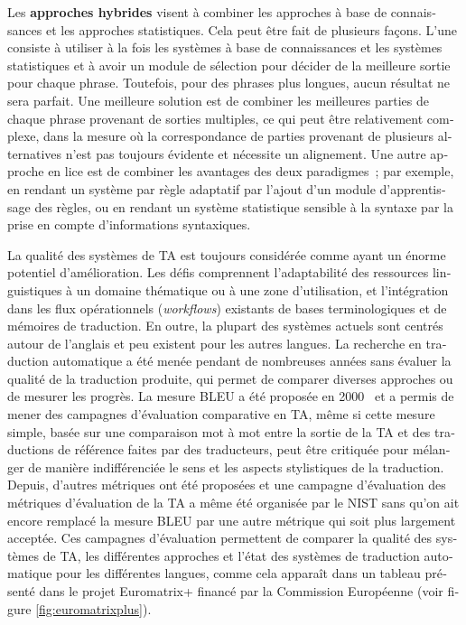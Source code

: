 \begin{french}
\begin{multicols}{2}
Les {\bf approches hybrides} visent à combiner les approches à base de
connaissances et les approches statistiques. Cela peut être fait de
plusieurs façons. L'une consiste à utiliser à la fois les
systèmes à base de connaissances et les systèmes statistiques et à
avoir un module de sélection pour décider de la meilleure sortie pour
chaque phrase. Toutefois, pour des phrases plus longues, aucun
résultat ne sera parfait. Une meilleure solution est de combiner les
meilleures parties de chaque phrase provenant de sorties multiples, ce
qui peut être relativement complexe, dans la mesure où la
correspondance de parties provenant de plusieurs alternatives n'est pas toujours évidente et nécessite un alignement. Une autre
approche en lice est de combiner les avantages des deux paradigmes~;
par exemple, en rendant un système par règle adaptatif par l'ajout d'un module d'apprentissage des règles, ou
en rendant un système statistique sensible à la syntaxe par la prise
en compte d'informations syntaxiques.

La qualité des systèmes de TA est toujours considérée comme ayant un
énorme potentiel d'amélioration. Les défis comprennent l'adaptabilité
des ressources linguistiques à un domaine thématique ou à une zone
d'utilisation, et l'intégration dans les flux opérationnels ({\em workflows}) existants de bases
terminologiques et de mémoires de traduction. En outre, la plupart des
systèmes actuels sont centrés autour de l'anglais et peu existent pour
les autres langues. La recherche en traduction automatique a été menée
pendant de nombreuses années sans évaluer la qualité de la traduction
produite, qui permet de comparer diverses approches ou de mesurer les
progrès. La mesure BLEU a été proposée en 2000~\cite{bleu02} et a permis de mener
des campagnes d'évaluation comparative en TA, même si cette mesure
simple, basée sur une comparaison mot à mot entre la sortie de la
TA et des traductions de référence faites par des
traducteurs, peut être critiquée pour mélanger de manière
indifférenciée le sens et les aspects stylistiques de la
traduction. Depuis, d'autres métriques ont été proposées et une
campagne d'évaluation des métriques d'évaluation de la TA a même été
organisée par le NIST sans qu'on ait encore remplacé la mesure BLEU
par une autre métrique qui soit plus largement acceptée. Ces campagnes
d'évaluation permettent de comparer la qualité des systèmes de TA, les
différentes approches et l'état des systèmes de traduction automatique pour les
différentes langues, comme cela apparaît dans un tableau présenté dans
le projet Euromatrix+ financé par la Commission Européenne (voir figure \ref{fig:euromatrixplus}).


\end{multicols}
\end{french}
